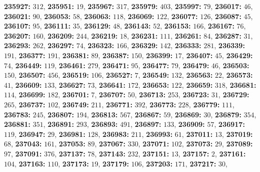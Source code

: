 \textsf{\bfseries 235927:} $312$, \textsf{\bfseries 235951:} $19$, \textsf{\bfseries 235967:} $317$, \textsf{\bfseries 235979:} $403$, \textsf{\bfseries 235997:} $79$, \textsf{\bfseries 236017:} $46$, \textsf{\bfseries 236021:} $90$, \textsf{\bfseries 236053:} $58$, \textsf{\bfseries 236063:} $118$, \textsf{\bfseries 236069:} $122$, \textsf{\bfseries 236077:} $126$, \textsf{\bfseries 236087:} $45$, \textsf{\bfseries 236107:} $95$, \textsf{\bfseries 236111:} $35$, \textsf{\bfseries 236129:} $48$, \textsf{\bfseries 236143:} $52$, \textsf{\bfseries 236153:} $166$, \textsf{\bfseries 236167:} $76$, \textsf{\bfseries 236207:} $160$, \textsf{\bfseries 236209:} $244$, \textsf{\bfseries 236219:} $18$, \textsf{\bfseries 236231:} $111$, \textsf{\bfseries 236261:} $84$, \textsf{\bfseries 236287:} $31$, \textsf{\bfseries 236293:} $262$, \textsf{\bfseries 236297:} $74$, \textsf{\bfseries 236323:} $166$, \textsf{\bfseries 236329:} $142$, \textsf{\bfseries 236333:} $281$, \textsf{\bfseries 236339:} $191$, \textsf{\bfseries 236377:} $191$, \textsf{\bfseries 236381:} $89$, \textsf{\bfseries 236387:} $150$, \textsf{\bfseries 236399:} $17$, \textsf{\bfseries 236407:} $45$, \textsf{\bfseries 236429:} $74$, \textsf{\bfseries 236449:} $119$, \textsf{\bfseries 236461:} $279$, \textsf{\bfseries 236471:} $95$, \textsf{\bfseries 236477:} $79$, \textsf{\bfseries 236479:} $46$, \textsf{\bfseries 236503:} $150$, \textsf{\bfseries 236507:} $456$, \textsf{\bfseries 236519:} $106$, \textsf{\bfseries 236527:} $7$, \textsf{\bfseries 236549:} $132$, \textsf{\bfseries 236563:} $22$, \textsf{\bfseries 236573:} $41$, \textsf{\bfseries 236609:} $133$, \textsf{\bfseries 236627:} $73$, \textsf{\bfseries 236641:} $172$, \textsf{\bfseries 236653:} $122$, \textsf{\bfseries 236659:} $318$, \textsf{\bfseries 236681:} $114$, \textsf{\bfseries 236699:} $182$, \textsf{\bfseries 236701:} $7$, \textsf{\bfseries 236707:} $50$, \textsf{\bfseries 236713:} $253$, \textsf{\bfseries 236723:} $31$, \textsf{\bfseries 236729:} $265$, \textsf{\bfseries 236737:} $102$, \textsf{\bfseries 236749:} $211$, \textsf{\bfseries 236771:} $392$, \textsf{\bfseries 236773:} $228$, \textsf{\bfseries 236779:} $111$, \textsf{\bfseries 236783:} $245$, \textsf{\bfseries 236807:} $194$, \textsf{\bfseries 236813:} $567$, \textsf{\bfseries 236867:} $59$, \textsf{\bfseries 236869:} $30$, \textsf{\bfseries 236879:} $354$, \textsf{\bfseries 236881:} $351$, \textsf{\bfseries 236891:} $293$, \textsf{\bfseries 236893:} $491$, \textsf{\bfseries 236897:} $133$, \textsf{\bfseries 236909:} $57$, \textsf{\bfseries 236917:} $119$, \textsf{\bfseries 236947:} $29$, \textsf{\bfseries 236981:} $128$, \textsf{\bfseries 236983:} $211$, \textsf{\bfseries 236993:} $61$, \textsf{\bfseries 237011:} $13$, \textsf{\bfseries 237019:} $68$, \textsf{\bfseries 237043:} $161$, \textsf{\bfseries 237053:} $89$, \textsf{\bfseries 237067:} $330$, \textsf{\bfseries 237071:} $102$, \textsf{\bfseries 237073:} $29$, \textsf{\bfseries 237089:} $97$, \textsf{\bfseries 237091:} $376$, \textsf{\bfseries 237137:} $78$, \textsf{\bfseries 237143:} $232$, \textsf{\bfseries 237151:} $13$, \textsf{\bfseries 237157:} $2$, \textsf{\bfseries 237161:} $104$, \textsf{\bfseries 237163:} $110$, \textsf{\bfseries 237173:} $19$, \textsf{\bfseries 237179:} $106$, \textsf{\bfseries 237203:} $171$, \textsf{\bfseries 237217:} $30$, 
